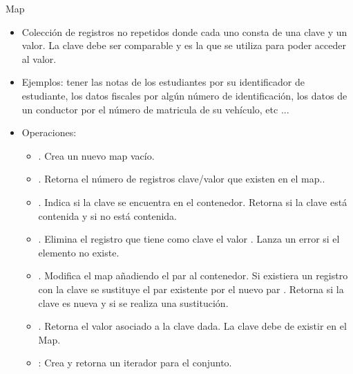 \documentclass[10pt,envcountsect,spanish]{beamer}
\begin{document}
\begin{frame}{Map}


\begin{itemize}%
\item Colección de registros no repetidos donde cada uno consta de una clave y un valor. La clave debe ser comparable y es la que se utiliza para poder acceder al valor.

\item Ejemplos: tener las notas de los estudiantes por su identificador de estudiante, los datos fiscales por algún número de identificación, los datos de un conductor por el número de matricula de su vehículo,  etc ... 


\item Operaciones:

\begin{itemize}
\item {}. Crea un nuevo map vacío.

\item {}. Retorna el número de registros clave/valor que existen en el map..

\item {}. Indica si la clave  se encuentra en el contenedor. Retorna  si la clave está contenida y  si no está contenida.


\item {}. Elimina el registro que tiene como clave el valor . Lanza un error si el elemento no existe.


\item {}. Modifica el map añadiendo el par  al contenedor. Si existiera un registro con la clave  se sustituye el par  existente por el nuevo par . Retorna  si la clave es nueva y  si se realiza una sustitución.


\item {}.  Retorna el valor asociado a la clave dada. La clave debe de existir en el Map.

\item {}: Crea y retorna un iterador para el conjunto.
\end{itemize}
\end{itemize}

\end{frame}
\end{document}
